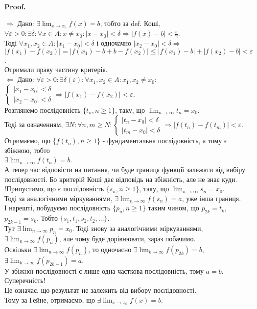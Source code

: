 \documentclass[a4paper, 14pt]{article}
\makeatletter
\def\qed{$\blacksquare$}
\def\rightproof{$\boxed{\Rightarrow}$ }
\def\leftproof{$\boxed{\Leftarrow}$ }
\theoremstyle{theoremdd}
\theoremstyle{theoremdd}
\theoremstyle{theoremdd}
\theoremstyle{theoremdd}
\theoremstyle{theoremdd}
\theoremstyle{theoremdd}
\theoremstyle{theoremdd}
\theoremstyle{theoremdd}
\renewenvironment{proof}[1][Proof.\\]{\par
\pushQED{\hfill \qed}%
\normalfont \topsep6\p@\@plus6\p@\relax
\trivlist
\item\relax
{\bfseries
#1\@addpunct{.}}\hspace\labelsep\ignorespaces
}{%
\popQED\endtrivlist\@endpefalse
}
\makeatother
\begin{document}
	\begin{proof}
\rightproof Дано: $\exists \displaystyle \lim_{x \to x_0} f(x) = b$, тобто за def. Коші,\\
$\forall \varepsilon > 0: \exists \delta: \forall x \in A: x \neq x_0: |x-x_0|<\delta \Rightarrow |f(x)-b|< \displaystyle \frac{\varepsilon}{2}$.\\
Тоді $\forall x_1, x_2 \in A: |x_1 - x_0| < \delta$ і одночачно $|x_2 - x_0| < \delta \Rightarrow$\\
$|f(x_1)-f(x_2)| = |f(x_1)-b + b - f(x_2)| \leq |f(x_1) - b| + |f(x_2)-b| < \varepsilon$.\\
Отримали праву частину критерія.
\bigskip \\
\leftproof Дано: $\forall \varepsilon > 0: \exists \delta(\varepsilon): \forall x_1,x_2 \in A: x_1,x_2 \neq x_0:$
$\begin{cases} |x_1-x_0|<\delta \\ |x_2-x_0|<\delta \end{cases} \Rightarrow |f(x_1)-f(x_2)|<\varepsilon$.\\
Розглянемо послідовність $\{t_n, n \geq 1\}$, таку, що $\displaystyle \lim_{n \to \infty} t_n = x_0$.\\
Тоді за означенням, $\exists N: \forall n,m \geq N: \begin{cases} |t_n-x_0|<\delta \\ |t_m-x_0|<\delta \end{cases} \Rightarrow |f(t_n)-f(t_m)|<\varepsilon$.\\
Отримаємо, що $\{f(t_n),n \geq 1\}$ - фундаментальна послідовність, а тому є збіжною, тобто\\
$\exists \displaystyle \lim_{n \to \infty} f(t_n) = b$.\\
А тепер час відповісти на питання, чи буде границя функції залежати від вибіру послідовності. Бо критерій Коші дає відповідь на збіжність, але не знає куди.\\
!Припустимо, що є послідовність $\{s_n, n \geq 1\}$, таку, що $\displaystyle \lim_{n \to \infty} s_n = x_0$.\\
Тоді за аналогічними міркуваннями, $\exists \displaystyle \lim_{n \to \infty} f(s_n) = a$, уже інша границя.
\bigskip \\
І нарешті, побудуємо послідовність $\{p_n, n \geq 1\}$ таким чином, що $p_{2k} = t_k$, $p_{2k-1} = s_k$. Тобто $\{s_1, t_1, s_2, t_2, \dots \}$.\\
Тут $\exists \displaystyle \lim_{n \to \infty} p_n = x_0$. Тоді знову за аналогічними міркуваннями, $\exists \displaystyle \lim_{n \to \infty} f(p_n)$, але чому буде дорівнювати, зараз побачимо.\\
Оскільки $\exists \displaystyle \lim_{n \to \infty} f(p_n)$, то одночасно $\exists \displaystyle \lim_{k \to \infty} f(p_{2k}) = b$, $\exists \displaystyle \lim_{k \to \infty} f(p_{2k-1}) = a$.\\
У збіжної послідовності є лише одна часткова послідовність, тому $a = b$. Суперечність!\\
Це означає, що результат не залежить від вибору послідовності.\\
Тому за Гейне, отримаємо, що $\exists \displaystyle \lim_{x \to x_0} f(x) = b$.
\end{proof}
\end{document}
